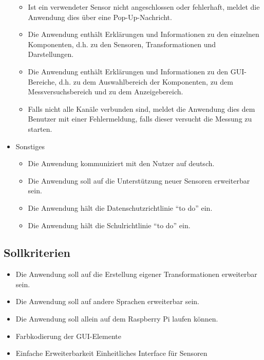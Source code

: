 \documentclass[parskip=full]{scrartcl}
\begin{document}
\begin{itemize}
\begin{itemize}
\item Ist ein verwendeter Sensor nicht angeschlossen oder fehlerhaft, meldet die Anwendung dies über eine Pop-Up-Nachricht.
\item Die Anwendung enthält Erklärungen und Informationen zu den einzelnen Komponenten, d.h. zu den Sensoren, Transformationen und Darstellungen.
\item Die Anwendung enthält Erklärungen und Informationen zu den GUI-Bereiche, d.h. zu dem Auswahlbereich der Komponenten, zu dem Messversuchsbereich und zu dem Anzeigebereich.
\item Falls nicht alle Kanäle verbunden sind, meldet die Anwendung dies dem Benutzer mit einer Fehlermeldung, falls dieser versucht die Messung zu starten. 

\end{itemize}

\item Sonstiges
\begin{itemize}

\item Die Anwendung kommuniziert mit den Nutzer auf deutsch.
\item Die Anwendung soll auf die Unterstützung neuer Sensoren erweiterbar sein.
\item Die Anwendung hält die Datenschutzrichtlinie "`to do"' ein.
\item Die Anwendung hält die Schulrichtlinie "`to do"' ein.

\end{itemize}

 \end{itemize}

\subsection{Sollkriterien}

\begin{itemize}

\item Die Anwendung soll auf die Erstellung eigener Transformationen erweiterbar sein.
\item Die Anwendung soll auf andere Sprachen erweiterbar sein.
\item Die Anwendung soll allein auf dem Raspberry Pi laufen können.
\item Farbkodierung der GUI-Elemente
\item Einfache Erweiterbarkeit
\subitem Einheitliches Interface für Sensoren


 \end{itemize}
\end{document}
